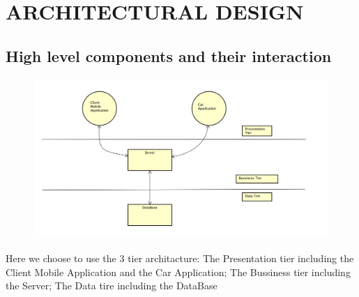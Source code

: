 \documentclass{article}
\begin{document}
	\section{ARCHITECTURAL DESIGN}
	
	\subsection{High level components and their interaction}
	\begin{figure}[h]
	\includegraphics[width=\textwidth]{High_Level}
	\end{figure}
	Here we choose to use the 3 tier architacture: The Presentation tier including the Client Mobile Application and the Car Application; The Bussiness tier including the Server; The Data tire including the DataBase
	\newpage
	
\end{document}
